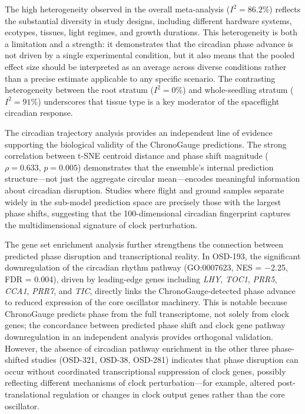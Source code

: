 \documentclass[11pt,a4paper]{article}
\begin{document}
The high heterogeneity observed in the overall meta-analysis ($I^2 = 86.2\%$) reflects the substantial diversity in study designs, including different hardware systems, ecotypes, tissues, light regimes, and growth durations. This heterogeneity is both a limitation and a strength: it demonstrates that the circadian phase advance is not driven by a single experimental condition, but it also means that the pooled effect size should be interpreted as an average across diverse conditions rather than a precise estimate applicable to any specific scenario. The contrasting heterogeneity between the root stratum ($I^2 = 0\%$) and whole-seedling stratum ($I^2 = 91\%$) underscores that tissue type is a key moderator of the spaceflight circadian response.

The circadian trajectory analysis provides an independent line of evidence supporting the biological validity of the ChronoGauge predictions. The strong correlation between t-SNE centroid distance and phase shift magnitude ($\rho = 0.633$, $p = 0.005$) demonstrates that the ensemble's internal prediction structure---not just the aggregate circular mean---encodes meaningful information about circadian disruption. Studies where flight and ground samples separate widely in the sub-model prediction space are precisely those with the largest phase shifts, suggesting that the 100-dimensional circadian fingerprint captures the multidimensional signature of clock perturbation.

The gene set enrichment analysis further strengthens the connection between predicted phase disruption and transcriptional reality. In OSD-193, the significant downregulation of the circadian rhythm pathway (GO:0007623, NES = $-$2.25, FDR = 0.004), driven by leading-edge genes including \textit{LHY}, \textit{TOC1}, \textit{PRR5}, \textit{CCA1}, \textit{PRR7}, and \textit{TIC}, directly links the ChronoGauge-detected phase advance to reduced expression of the core oscillator machinery. This is notable because ChronoGauge predicts phase from the full transcriptome, not solely from clock genes; the concordance between predicted phase shift and clock gene pathway downregulation in an independent analysis provides orthogonal validation. However, the absence of circadian pathway enrichment in the other three phase-shifted studies (OSD-321, OSD-38, OSD-281) indicates that phase disruption can occur without coordinated transcriptional suppression of clock genes, possibly reflecting different mechanisms of clock perturbation---for example, altered post-translational regulation or changes in clock output genes rather than the core oscillator.
\end{document}
